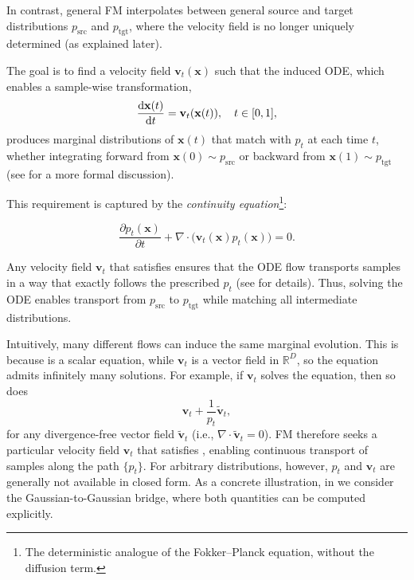In contrast, general FM interpolates between general source and target distributions $p_{\text{src}}$ and $p_{\text{tgt}}$, where the velocity field is no longer uniquely determined (as explained later).

The goal is to find a velocity field $\mathbf{v}_t(\mathbf{x})$ such that the induced ODE, which enables a sample-wise transformation,
\[
\frac{\mathop{}\!\mathrm{d} \mathbf{x}(t)}{\mathop{}\!\mathrm{d} t} = \mathbf{v}_t(\mathbf{x}(t)), \quad t \in [0,1],
\]
produces marginal distributions of  $\mathbf{x}(t)$ that match with  $ p_t$ at each time $t$, whether integrating forward from $\mathbf{x}(0) \sim p_{\text{src}}$ or backward from $\mathbf{x}(1) \sim p_{\text{tgt}}$ (see  for a more formal discussion). 

This requirement is captured by the \emph{continuity equation}\footnote{The deterministic analogue of the Fokker–Planck equation, without the diffusion term.}:
\begin{mdframed}
\begin{equation}\label{eq:continuity_eq}
    \frac{\partial p_t(\mathbf{x})}{\partial t} + \nabla \cdot \big( \mathbf{v}_t(\mathbf{x}) p_t(\mathbf{x}) \big) = 0.
\end{equation}
\end{mdframed}

Any velocity field $\mathbf{v}_t$ that satisfies  
ensures that the ODE flow transports samples in a way that exactly follows 
the prescribed $p_t$ (see  for details). 
Thus, solving the ODE enables transport from $p_{\text{src}}$ to 
$p_{\text{tgt}}$ while matching all intermediate distributions.

Intuitively, many different flows can induce the same marginal evolution. 
This is because  is a scalar equation, while 
$\mathbf{v}_t$ is a vector field in $\mathbb{R}^D$, so the equation admits 
infinitely many solutions. For example, if $\mathbf{v}_t$ solves the equation, 
then so does
\[
\mathbf{v}_t + \frac{1}{p_t} \tilde{\mathbf{v}}_t,
\]
for any divergence-free vector field $\tilde{\mathbf{v}}_t$ (i.e., 
$\nabla \cdot \tilde{\mathbf{v}}_t = 0$). FM therefore seeks a particular velocity field $\mathbf{v}_t$ 
that satisfies , enabling continuous transport of samples 
along the path $\{p_t\}$.  
For arbitrary distributions, however, $p_t$ and $\mathbf{v}_t$ are generally not 
available in closed form.  
As a concrete illustration, in  we 
consider the Gaussian-to-Gaussian bridge, where both quantities can be computed 
explicitly.





